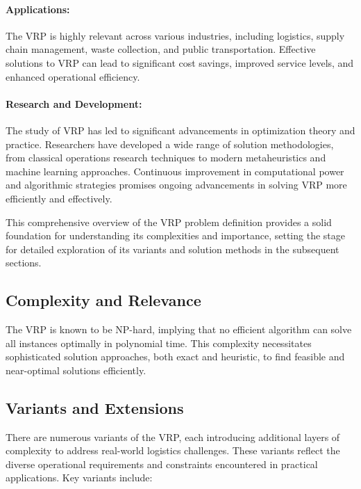 \documentclass[
]{article}
\begin{document}
\paragraph{Applications:}
The VRP is highly relevant across various industries, including logistics, supply chain management, waste collection, and public transportation. Effective solutions to VRP can lead to significant cost savings, improved service levels, and enhanced operational efficiency.


\paragraph{Research and Development:}
The study of VRP has led to significant advancements in optimization theory and practice. Researchers have developed a wide range of solution methodologies, from classical operations research techniques to modern metaheuristics and machine learning approaches. Continuous improvement in computational power and algorithmic strategies promises ongoing advancements in solving VRP more efficiently and effectively.

This comprehensive overview of the VRP problem definition provides a solid foundation for understanding its complexities and importance, setting the stage for detailed exploration of its variants and solution methods in the subsequent sections.


\subsection{Complexity and Relevance}
The VRP is known to be NP-hard, implying that no efficient algorithm can solve all instances optimally in polynomial time. This complexity necessitates sophisticated solution approaches, both exact and heuristic, to find feasible and near-optimal solutions efficiently.

\subsection{Variants and Extensions}
There are numerous variants of the VRP, each introducing additional layers of complexity to address real-world logistics challenges. These variants reflect the diverse operational requirements and constraints encountered in practical applications. Key variants include:
\end{document}
